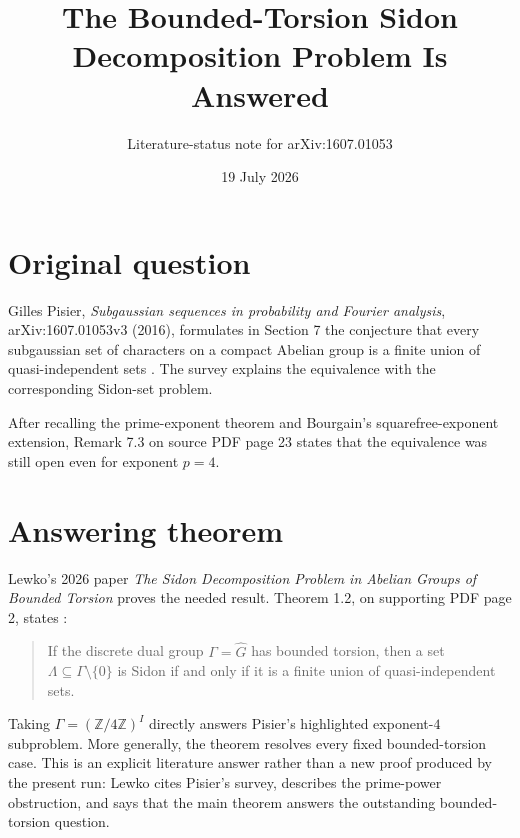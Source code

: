\documentclass[11pt]{article}
\title{The Bounded-Torsion Sidon Decomposition Problem Is Answered}
\author{Literature-status note for arXiv:1607.01053}
\date{19 July 2026}
\begin{document}
\maketitle

\begin{center}
\end{center}

\section*{Original question}

Gilles Pisier, \emph{Subgaussian sequences in probability and Fourier
analysis}, arXiv:1607.01053v3 (2016), formulates in Section 7 the conjecture
that every subgaussian set of characters on a compact Abelian group is a
finite union of quasi-independent sets \cite{pisier}.  The survey explains
the equivalence with the corresponding Sidon-set problem.

After recalling the prime-exponent theorem and Bourgain's squarefree-exponent
extension, Remark 7.3 on source PDF page 23 states that the equivalence was
still open even for exponent $p=4$.

\section*{Answering theorem}

Lewko's 2026 paper \emph{The Sidon Decomposition Problem in Abelian Groups of
Bounded Torsion} proves the needed result.  Theorem 1.2, on supporting PDF
page 2, states \cite{lewko}:

\begin{quote}
If the discrete dual group $\Gamma=\widehat G$ has bounded torsion, then a
set $\Lambda\subseteq\Gamma\setminus\{0\}$ is Sidon if and only if it is a
finite union of quasi-independent sets.
\end{quote}

Taking $\Gamma=(\mathbb Z/4\mathbb Z)^I$ directly answers Pisier's highlighted
exponent-$4$ subproblem.  More generally, the theorem resolves every fixed
bounded-torsion case.  This is an explicit literature answer rather than a
new proof produced by the present run: Lewko cites Pisier's survey, describes
the prime-power obstruction, and says that the main theorem answers the
outstanding bounded-torsion question.
\end{document}

